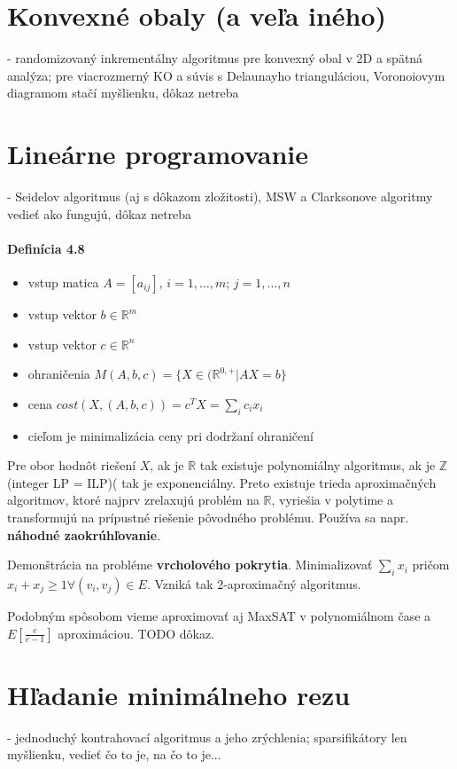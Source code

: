 \documentclass[12pt,a4paper]{article}
\begin{document}
\section{Konvexné obaly (a veľa iného)}
 - randomizovaný inkrementálny algoritmus pre konvexný obal v 2D a spätná analýza; pre viacrozmerný KO a súvis s Delaunayho trianguláciou, Voronoiovym diagramom stačí myšlienku, dôkaz netreba
 

\section{Lineárne programovanie}
 - Seidelov algoritmus (aj s dôkazom zložitosti), MSW a Clarksonove algoritmy vedieť ako fungujú, dôkaz netreba
 
\paragraph{Definícia 4.8} 
\begin{itemize} 
  \item vstup matica $A = [a_{ij}]$, $i = 1,\ldots,m$; $j=1,\ldots,n$
  \item vstup vektor $b \in \mathbb{R}^m$
  \item vstup vektor $c \in \mathbb{R}^n$
  \item ohraničenia $M(A,b,c) = \{X \in (\mathbb{R}^{0,+} | AX = b\}$
  \item cena $cost(X, (A,b,c)) = c^TX = \sum_i c_ix_i$
  \item cieľom je minimalizácia ceny pri dodržaní ohraničení
\end{itemize} 
Pre obor hodnôt riešení $X$, ak je $\mathbb{R}$ tak existuje polynomiálny algoritmus, ak je $\mathbb{Z}$ (integer LP = ILP)( tak je exponenciálny. Preto existuje trieda aproximačných algoritmov, ktoré najprv zrelaxujú problém na $\mathbb{R}$, vyriešia v polytime a transformujú na prípustné riešenie pôvodného problému. Používa sa napr. {\bf náhodné zaokrúhľovanie}. 

Demonštrácia na probléme {\bf vrcholového pokrytia}. Minimalizovať $\sum_i x_i$ pričom $x_i + x_j \geq 1 \forall (v_i, v_j) \in E$. Vzniká tak 2-aproximačný algoritmus. 

Podobným spôsobom vieme aproximovať aj MaxSAT v polynomiálnom čase a $E[\frac{e}{e-1}]$ aproximáciou. TODO dôkaz. 

\section{Hľadanie minimálneho rezu}
\label{sec:min-cut} 
 - jednoduchý kontrahovací algoritmus a jeho zrýchlenia; sparsifikátory len myšlienku, vedieť čo to je, na čo to je...
 
\end{document}
